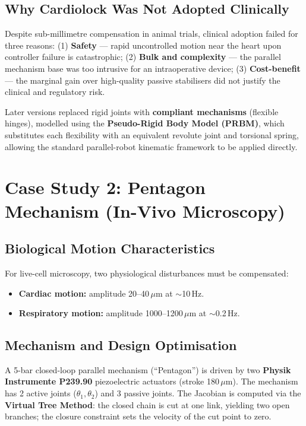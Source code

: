 \documentclass[11pt,a4paper,twoside]{report}
\begin{document}
\subsection{Why Cardiolock Was Not Adopted Clinically}
Despite sub-millimetre compensation in animal trials, clinical adoption failed for three reasons: (1) \textbf{Safety} — rapid uncontrolled motion near the heart upon controller failure is catastrophic; (2) \textbf{Bulk and complexity} — the parallel mechanism base was too intrusive for an intraoperative device; (3) \textbf{Cost-benefit} — the marginal gain over high-quality passive stabilisers did not justify the clinical and regulatory risk.

Later versions replaced rigid joints with \textbf{compliant mechanisms} (flexible hinges), modelled using the \textbf{Pseudo-Rigid Body Model (PRBM)}, which substitutes each flexibility with an equivalent revolute joint and torsional spring, allowing the standard parallel-robot kinematic framework to be applied directly.

\section{Case Study 2: Pentagon Mechanism (In-Vivo Microscopy)}
\subsection{Biological Motion Characteristics}
For live-cell microscopy, two physiological disturbances must be compensated:
\begin{itemize}
    \item \textbf{Cardiac motion:} amplitude 20--40\,$\mu$m at $\sim$10\,Hz.
    \item \textbf{Respiratory motion:} amplitude 1000--1200\,$\mu$m at $\sim$0.2\,Hz.
\end{itemize}

\subsection{Mechanism and Design Optimisation}
A 5-bar closed-loop parallel mechanism (``Pentagon'') is driven by two \textbf{Physik Instrumente P239.90} piezoelectric actuators (stroke 180\,$\mu$m). The mechanism has 2 active joints ($\theta_1, \theta_2$) and 3 passive joints. The Jacobian is computed via the \textbf{Virtual Tree Method}: the closed chain is cut at one link, yielding two open branches; the closure constraint sets the velocity of the cut point to zero.
\end{document}
